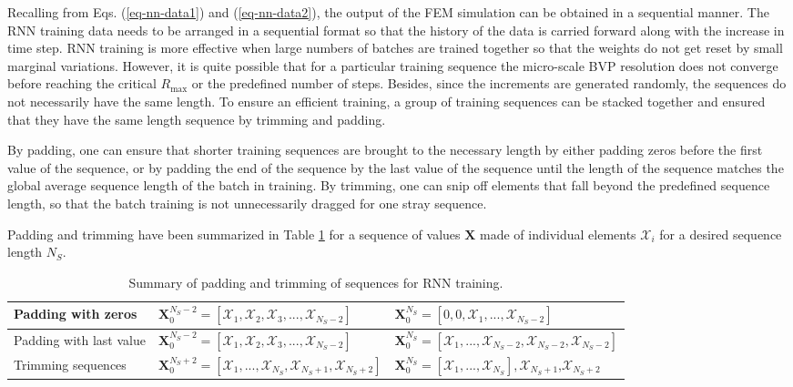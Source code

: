 Recalling from Eqs. (\ref{eq-nn-data1}) and (\ref{eq-nn-data2}), the output of the FEM simulation can be obtained in a sequential manner. The RNN training data needs to be arranged in a sequential format so that the history of the data is carried forward along with the increase in time step. RNN training is more effective when large numbers of batches are trained together so that the weights do not get reset by small marginal variations. However, it is quite possible that for a particular training sequence the micro-scale BVP resolution does not converge before reaching the critical $ R_\text{max} $ or the predefined number of steps. Besides, since the increments are generated randomly, the sequences do not necessarily have the same length. To ensure an efficient training, a group of training sequences can be stacked together and ensured that they have the same length sequence by trimming and padding.

By padding, one can ensure that shorter training sequences are brought to the necessary length by either padding zeros before the first value of the sequence, or by padding the end of the sequence by the last value of the sequence until the length of the sequence matches the global average sequence length of the batch in training. By trimming, one can snip off elements that fall beyond the predefined sequence length, so that the batch training is not unnecessarily dragged for one stray sequence. 

{Padding and trimming have been summarized in Table \ref{tab_padding} for a sequence of values $ \textbf{X} $ made of individual elements $ \mathcal{X}_i $ for a desired sequence length $ N_S $.}

\begin{table}
	\begin{tabular}{|>{\raggedright\arraybackslash}p{}|p{}|p{}|}
\hline
\rule{0pt}{4ex}    
Padding with zeros & \raggedright\arraybackslash$ \textbf{X}_0^{N_S-2}$$=$$\left[\mathcal{X}_1,\mathcal{X}_2,\mathcal{X}_3,...,\mathcal{X}_{N_S-2}\right] $ & \raggedright\arraybackslash$ \textbf{X}_0^{N_S}$$=$$\left[0,0,\mathcal{X}_1,...,\mathcal{X}_{N_S-2}\right] $\\ 
\hline 
\rule{0pt}{4ex}    
Padding with last value & \raggedright\arraybackslash$ \textbf{X}_0^{N_S-2}$$=$$\left[\mathcal{X}_1,\mathcal{X}_2,\mathcal{X}_3,...,\mathcal{X}_{N_S-2}\right] $ & \raggedright\arraybackslash$ \textbf{X}_0^{N_S}$$=$$\left[\mathcal{X}_1,...,\mathcal{X}_{N_S-2},\mathcal{X}_{N_S-2},\mathcal{X}_{N_S-2}\right] $\\ 
\hline 
\rule{0pt}{4ex}    
Trimming sequences & \raggedright\arraybackslash$ \textbf{X}_0^{N_S+2}$$=$$\left[\mathcal{X}_1,...,\mathcal{X}_{N_S},\mathcal{X}_{N_S+1},\mathcal{X}_{N_S+2}\right] $ & \raggedright\arraybackslash$ \textbf{X}_0^{N_S}$$=$$\left[\mathcal{X}_1,...,\mathcal{X}_{N_S}\right],$\sout{$\mathcal{X}_{N_S+1}$},\sout{$\mathcal{X}_{N_S+2}$} \\ 
\hline
	\end{tabular}
\caption{Summary of padding and trimming of sequences for RNN training.}\label{tab_padding}
\end{table}


